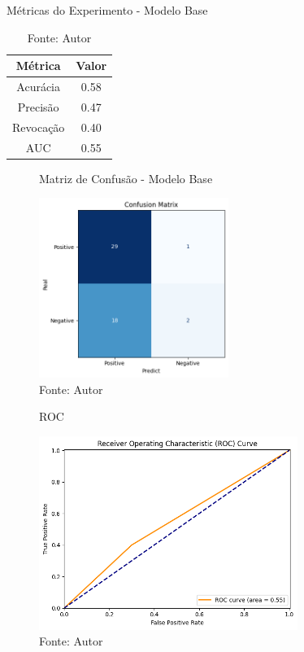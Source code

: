 \begin{table}[h!]
    \centering
    \caption{Métricas do Experimento - Modelo Base}
    \renewcommand{\arraystretch}{1} %
    \begin{tabular}{|c|c|}
    \hline 
          \textbf{Métrica} & \textbf{Valor} \\ 
    \hline 
        Acurácia & 0.58 \\ 
    \hline 
        Precisão & 0.47 \\ 
    \hline 
        Revocação & 0.40 \\ 
    \hline 
        AUC & 0.55 \\ 
    \hline 
    \end{tabular} 
    \caption*{Fonte: Autor}
    \label{tab:metrics}
\end{table}

\begin{figure}[h!]
    \centering
    \caption{Matriz de Confusão -  Modelo Base}
    \includegraphics[width=0.55\textwidth]{figures/fig016.png}
    \caption*{Fonte: Autor}
    \label{fig:fig016}
\end{figure}

\begin{figure}[h!]
    \centering
    \caption{ROC}
    \includegraphics[width=0.75\textwidth]{figures/fig017.png}
    \caption*{Fonte: Autor}
    \label{fig:fig017}
\end{figure}


